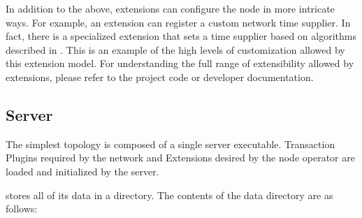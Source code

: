 In addition to the above, extensions can configure the node in more intricate ways.
For example, an extension can register a custom network time supplier.
In fact, there is a specialized extension that sets a time supplier based on algorithms described in .
This is an example of the high levels of customization allowed by this extension model.
For understanding the full range of extensibility allowed by extensions, please refer to the project code or developer documentation\nemtechdocsfootnote{}.

\subsection{Server}

The simplest \codenamespace topology is composed of a single server executable.
Transaction Plugins required by the network and \codenamespace Extensions desired by the node operator are loaded and initialized by the server.

\codenamespace stores all of its data in a  directory.
The contents of the data directory are as follows:

